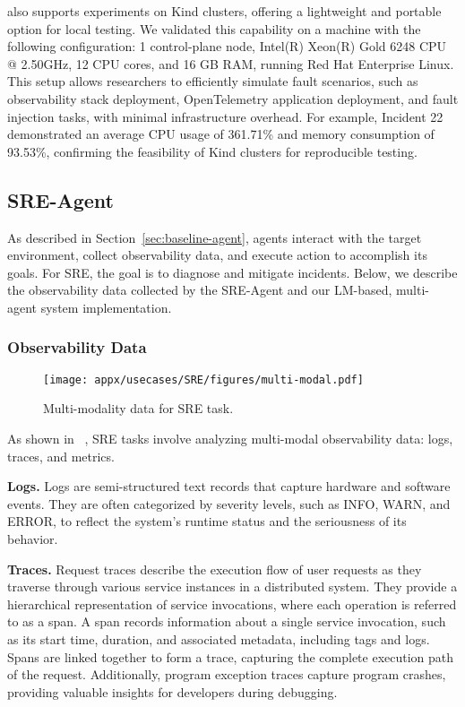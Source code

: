 \bench also supports experiments on Kind clusters, offering a lightweight and portable option for local testing. We validated this capability on a machine with the following configuration: 1 control-plane node, Intel(R) Xeon(R) Gold 6248 CPU @ 2.50GHz, 12 CPU cores, and 16 GB RAM, running Red Hat Enterprise Linux. This setup allows researchers to efficiently simulate fault scenarios, such as observability stack deployment, OpenTelemetry application deployment, and fault injection tasks, with minimal infrastructure overhead. For example, Incident 22 demonstrated an average CPU usage of 361.71\% and memory consumption of 93.53\%, confirming the feasibility of Kind clusters for reproducible testing.


\subsection{SRE-Agent}
\label{ss:sre-agent}
As described in Section~\ref{sec:baseline-agent}, agents interact with the target environment, collect observability data, and execute action to accomplish its goals. For SRE, the goal is to diagnose and mitigate incidents. Below, we describe the observability data collected by the SRE-Agent and our LM-based, multi-agent system implementation. 

\subsubsection{Observability Data}
\begin{figure}[htbp!]
    \centering
    \texttt{[image: appx/usecases/SRE/figures/multi-modal.pdf]}
    \caption{Multi-modality data for SRE task.} 
    \label{fig:ss-bench-sre-multi-modality}
\end{figure} 
As shown in ~, SRE tasks involve analyzing multi-modal observability data: logs, traces, and metrics. 

\textbf{Logs.} Logs are semi-structured text records that capture hardware and software events. They are often categorized by severity levels, such as INFO, WARN, and ERROR, to reflect the system's runtime status and the seriousness of its behavior.

\textbf{Traces.} Request traces describe the execution flow of user requests as they traverse through various service instances in a distributed system. They provide a hierarchical representation of service invocations, where each operation is referred to as a span. A span records information about a single service invocation, such as its start time, duration, and associated metadata, including tags and logs. Spans are linked together to form a trace, capturing the complete execution path of the request. Additionally, program exception traces capture program crashes, providing valuable insights for developers during debugging.

